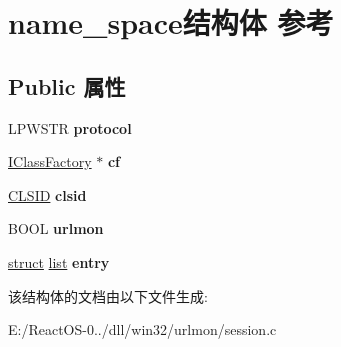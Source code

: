 \hypertarget{structname__space}{}\section{name\+\_\+space结构体 参考}
\label{structname__space}
\subsection*{Public 属性}
\begin{DoxyCompactItemize}
\item 
\mbox{\label{structname__space_aa2cf4c3eb4706d9bd153305db9cb3890}} 
L\+P\+W\+S\+TR {\bfseries protocol}
\item 
\mbox{\label{structname__space_af179748adb5014e22bc4b2bf77e6e04e}} 
\hyperlink{interface_i_class_factory}{I\+Class\+Factory} $\ast$ {\bfseries cf}
\item 
\mbox{\label{structname__space_ac9115ee9ed5c149b4e1c68e56ac676bc}} 
\hyperlink{struct___i_i_d}{C\+L\+S\+ID} {\bfseries clsid}
\item 
\mbox{\label{structname__space_a76b0752d49a1b7a5d0d93a3df551551b}} 
B\+O\+OL {\bfseries urlmon}
\item 
\mbox{\label{structname__space_af9c3488c58d1ea96fdfefc974044d88a}} 
\hyperlink{interfacestruct}{struct} \hyperlink{classlist}{list} {\bfseries entry}
\end{DoxyCompactItemize}


该结构体的文档由以下文件生成\+:\begin{DoxyCompactItemize}
\item 
E\+:/\+React\+O\+S-\/0../dll/win32/urlmon/session.\+c\end{DoxyCompactItemize}
